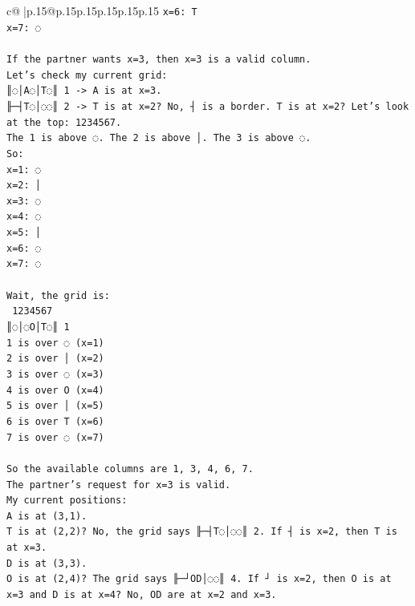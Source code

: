 \documentclass{article}
\begin{document}
{\begin{supertabular}{c@{$\;$}|p{.15\linewidth}@{}p{.15\linewidth}p{.15\linewidth}p{.15\linewidth}p{.15\linewidth}p{.15\linewidth}}
{{{\texttt{x=6: T} \\
\texttt{x=7: ◌} \\
\\ 
\texttt{If the partner wants x=3, then x=3 is a valid column.} \\
\texttt{Let's check my current grid:} \\
\texttt{║◌│A◌│T◌║ 1 {-}> A is at x=3.} \\
\texttt{╟─┤T◌│◌◌║ 2 {-}> T is at x=2? No, ┤ is a border. T is at x=2? Let's look at the top: 1234567.} \\
\texttt{The 1 is above ◌. The 2 is above │. The 3 is above ◌.} \\
\texttt{So:} \\
\texttt{x=1: ◌} \\
\texttt{x=2: │} \\
\texttt{x=3: ◌} \\
\texttt{x=4: ◌} \\
\texttt{x=5: │} \\
\texttt{x=6: ◌} \\
\texttt{x=7: ◌} \\
\\ 
\texttt{Wait, the grid is:} \\
\texttt{ 1234567} \\
\texttt{║◌│◌O│T◌║ 1} \\
\texttt{1 is over ◌ (x=1)} \\
\texttt{2 is over │ (x=2)} \\
\texttt{3 is over ◌ (x=3)} \\
\texttt{4 is over O (x=4)} \\
\texttt{5 is over │ (x=5)} \\
\texttt{6 is over T (x=6)} \\
\texttt{7 is over ◌ (x=7)} \\
\\ 
\texttt{So the available columns are 1, 3, 4, 6, 7.} \\
\texttt{The partner's request for x=3 is valid.} \\
\texttt{My current positions:} \\
\texttt{A is at (3,1).} \\
\texttt{T is at (2,2)? No, the grid says ╟─┤T◌│◌◌║ 2. If ┤ is x=2, then T is at x=3.} \\
\texttt{D is at (3,3).} \\
\texttt{O is at (2,4)? The grid says ╟─┘OD│◌◌║ 4. If ┘ is x=2, then O is at x=3 and D is at x=4? No, OD are at x=2 and x=3.} \\
}}}
\end{supertabular}}
\end{document}
